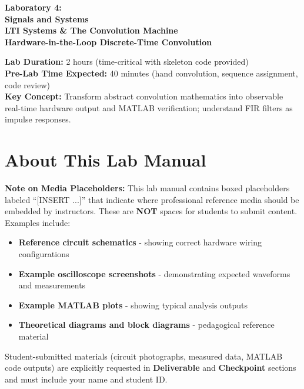 \documentclass[11pt,letterpaper]{article}
\begin{document}
\begin{center}
\huge{\bf Laboratory 4:}\\
\vspace{0.2in}
\Large{\bf Signals and Systems}\\
\Large{\bf LTI Systems \& The Convolution Machine}\\
\vspace{0.2in}
\normalsize{\bf Hardware-in-the-Loop Discrete-Time Convolution}
\end{center}

\vspace{0.3in}
\noindent
\textbf{Lab Duration:} 2 hours (time-critical with skeleton code provided)\\
\textbf{Pre-Lab Time Expected:} 40 minutes (hand convolution, sequence assignment, code review)\\
\textbf{Key Concept:} Transform abstract convolution mathematics into observable real-time hardware output and MATLAB verification; understand FIR filters as impulse responses.

\tableofcontents
\clearpage

\section*{About This Lab Manual}

\textbf{Note on Media Placeholders:} This lab manual contains boxed placeholders labeled ``[INSERT ...]'' that indicate where professional reference media should be embedded by instructors. These are \textbf{NOT} spaces for students to submit content. Examples include:

\begin{itemize}
    \item \textbf{Reference circuit schematics} - showing correct hardware wiring configurations
    \item \textbf{Example oscilloscope screenshots} - demonstrating expected waveforms and measurements
    \item \textbf{Example MATLAB plots} - showing typical analysis outputs
    \item \textbf{Theoretical diagrams and block diagrams} - pedagogical reference material
\end{itemize}

\noindent Student-submitted materials (circuit photographs, measured data, MATLAB code outputs) are explicitly requested in \textbf{Deliverable} and \textbf{Checkpoint} sections and must include your name and student ID.
\end{document}
